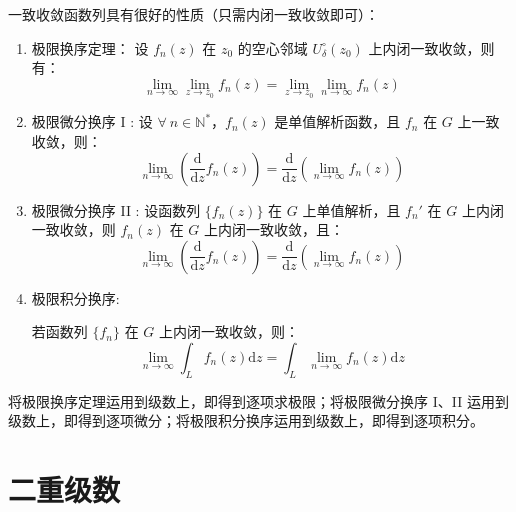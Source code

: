 \documentclass[UTF8]{report}
\def\N{\mathbb{N}}
\theoremstyle{MyLineTheoremStyle} %
\theoremstyle{MyBlockTheoremStyle} %
\theoremstyle{MySubsubsectionStyle} %
\begin{document}
一致收敛函数列具有很好的性质（只需内闭一致收敛即可）：
\begin{enumerate}
\item 极限换序定理：
设 $f_n(z)$ 在 $z_0$ 的空心邻域 $U^\circ_\delta(z_0)$ 上内闭一致收敛，则有：
\begin{equation}
\lim_{n \to \infty}\lim_{z \to z_0} f_n(z) =\lim_{z \to z_0}  \lim_{n \to \infty} f_n(z)
\end{equation}


\item 极限微分换序 I : 设 $\forall\ n \in \N^*$，$f_n(z)$ 是单值解析函数，且 $f_n$ 在 $G$ 上一致收敛，则：
\begin{equation}
\lim_{n \to \infty} \left(\frac{\mathrm{d}}{\mathrm{d} z}  f_n(z)\right) = \frac{\mathrm{d}}{\mathrm{d} z} \left( \lim_{n \to \infty} f_n(z) \right)
\end{equation}

\item 极限微分换序 II : 设函数列 $\{f_n(z)\}$ 在 $G$ 上单值解析，且 $f_n'$ 在 $G$ 上内闭一致收敛，则 $f_n(z)$ 在 $G$ 上内闭一致收敛，且：
\begin{equation}
    \lim_{n \to \infty} \left(\frac{\mathrm{d}}{\mathrm{d} z}  f_n(z)\right) = \frac{\mathrm{d}}{\mathrm{d} z} \left( \lim_{n \to \infty} f_n(z) \right)
    \end{equation}

\item 极限积分换序:

若函数列 $\{f_n\}$ 在 $G$ 上内闭一致收敛，则：
\begin{equation}
\lim_{n \to \infty} \int_{L} f_n(z) \mathrm{d}z = \int_{L} \lim_{n \to \infty} f_n(z) \mathrm{d}z
\end{equation}

\end{enumerate}

将极限换序定理运用到级数上，即得到逐项求极限；将极限微分换序 I、II 运用到级数上，即得到逐项微分；将极限积分换序运用到级数上，即得到逐项积分。

\section{二重级数}
\end{document}
